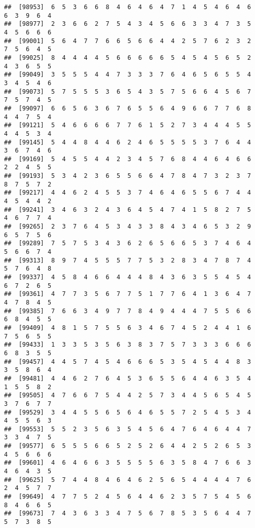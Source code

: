 \documentclass[
]{book}
\begin{document}
\begin{verbatim}
##  [98953]  6  5  3  6  6  8  4  6  4  6  4  7  1  4  5  4  6  4  6  6  3  9  6  4
##  [98977]  2  3  6  6  2  7  5  4  3  4  5  6  6  3  3  4  7  3  5  4  5  6  6  6
##  [99001]  5  6  4  7  7  6  6  5  6  6  4  4  2  5  7  6  2  3  2  7  5  6  4  5
##  [99025]  8  4  4  4  4  5  6  6  6  6  6  5  4  5  4  5  6  5  2  4  3  6  5  5
##  [99049]  3  5  5  5  4  4  7  3  3  3  7  6  4  6  5  6  5  5  4  3  4  5  4  6
##  [99073]  5  7  5  5  5  3  6  5  4  3  5  7  5  6  6  4  5  6  7  7  5  7  4  5
##  [99097]  6  6  5  6  3  6  7  6  5  5  6  4  9  6  6  7  7  6  8  4  4  7  5  4
##  [99121]  5  4  6  6  6  6  7  7  6  1  5  2  7  3  4  4  4  5  5  4  4  5  3  4
##  [99145]  5  4  4  8  4  4  6  2  4  6  5  5  5  5  3  7  6  4  4  3  6  7  4  6
##  [99169]  5  4  5  5  4  4  2  3  4  5  7  6  8  4  4  6  4  6  6  2  2  4  5  5
##  [99193]  5  3  4  2  3  6  5  5  6  6  4  7  8  4  7  3  2  3  7  8  7  5  7  2
##  [99217]  4  4  6  2  4  5  5  3  7  4  6  4  6  5  5  6  7  4  4  4  5  4  4  2
##  [99241]  3  4  6  3  2  4  3  6  4  5  4  7  4  1  5  8  2  7  5  4  6  7  7  4
##  [99265]  2  3  7  6  4  5  3  4  3  3  8  4  3  4  6  5  3  2  9  6  5  7  5  6
##  [99289]  7  5  7  5  3  4  3  6  2  6  5  6  6  5  3  7  4  6  4  5  6  6  7  4
##  [99313]  8  9  7  4  5  5  5  7  7  5  3  2  8  3  4  7  8  7  4  5  7  6  4  8
##  [99337]  4  5  8  4  6  6  4  4  4  8  4  3  6  3  5  5  4  5  4  6  7  2  6  5
##  [99361]  4  7  7  3  5  6  7  7  5  1  7  7  6  4  1  3  6  4  7  4  7  8  4  5
##  [99385]  7  6  6  3  4  9  7  7  8  4  9  4  4  4  7  5  5  6  6  6  8  4  5  5
##  [99409]  4  8  1  5  7  5  5  6  3  4  6  7  4  5  2  4  4  1  6  7  5  6  5  5
##  [99433]  1  3  3  5  3  5  6  3  8  3  7  5  7  3  3  3  6  6  6  6  8  3  5  5
##  [99457]  4  4  5  7  4  5  4  6  6  6  5  3  5  4  5  4  4  8  3  3  5  8  6  4
##  [99481]  4  4  6  2  7  6  4  5  3  6  5  5  6  4  4  6  3  5  4  1  5  5  8  2
##  [99505]  4  7  6  6  7  5  4  4  2  5  7  3  4  4  5  6  5  4  5  3  7  6  7  7
##  [99529]  3  4  4  5  5  6  5  6  4  6  5  5  7  2  5  4  5  3  4  4  5  5  6  3
##  [99553]  5  5  2  3  5  6  3  5  4  5  6  4  7  6  4  6  4  4  7  3  3  4  7  5
##  [99577]  6  5  5  5  6  6  5  2  5  2  6  4  4  2  5  2  6  5  3  4  5  6  6  6
##  [99601]  4  6  4  6  6  3  5  5  5  5  6  3  5  8  4  7  6  6  3  4  6  4  3  5
##  [99625]  5  7  4  4  8  4  6  4  6  2  5  6  5  4  4  4  4  7  6  2  4  5  7  7
##  [99649]  4  7  7  5  2  4  5  6  4  4  6  2  3  5  7  5  4  5  6  8  4  6  6  5
##  [99673]  7  4  3  6  3  3  4  7  5  6  7  8  5  3  5  6  4  4  7  5  7  3  8  5

\end{verbatim}
\end{document}

